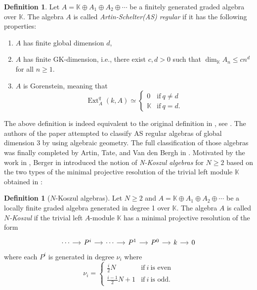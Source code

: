 \documentclass[reqno]{amsart}
\newcommand{\bbK}{\mathbb{K}}
\DeclareMathOperator{\ext}{Ext}
\numberwithin{equation}{section}
\theoremstyle{plain}
\theoremstyle{definition}
\newtheorem{de}[equation]{Definition}
\begin{document}
\begin{de}\cite{RogalskiAS}
    Let $A=\bbK\oplus A_1\oplus A_2\oplus\cdots$ be a finitely generated graded algebra over $\bbK$. The algebra $A$ is called \emph{Artin-Schelter(AS) regular} if it has the following properties:
    \begin{enumerate}
        \item $A$ has finite global dimension $d$, 
        \item $A$ has finite GK-dimension, i.e., there exist $c, d>0$ such that $\dim_\bbK A_n\leq cn^d$ for all $n\geq1$.
        \item $A$ is Gorenstein, meaning that
        $$\ext^q_A(k, A)\simeq\left\{\begin{array}{llll}
        0 & \text{if}\ q\neq d\\
        \bbK & \text{if}\ q=d.
        \end{array}\right.$$
    \end{enumerate}
\end{de}

The above definition is indeed equivalent to the original definition in \cite{ArtinSchelter}, see \cite[Remark 2.13]{RogalskiNPC}.
The authors of the paper \cite{ArtinSchelter} attempted to classify AS regular algebras of global dimension 3 by using algebraic geometry. The full classification of those algebras was finally completed by Artin, Tate, and Van den Bergh in \cite{ArtinTateVandenBerghelliptic}. Motivated by the work in \cite{ArtinSchelter}, Berger in \cite{Berger} introduced the notion of \emph{N-Koszul algebras} for $N\geq 2$ based on the two types of the minimal projective resolution of the trivial left module $\bbK$ obtained in \cite{ArtinSchelter}: 

\begin{de}[$N$-Koszul algebras]\cite[Definition 2.10]{Berger}
    Let $N\geq2$ and $A=\bbK\oplus A_1\oplus A_2\oplus\cdots$ be a locally finite graded algebra generated in degree 1 over $\bbK$. The algebra $A$ is called \emph{$N$-Koszul} if the trivial left $A$-module $\bbK$ has a minimal projective resolution of the form
\[\begin{tikzcd}[column sep=small]
	\cdots & {P^i} & \cdots & {P^1} & {P^0} & k & 0
	\arrow[from=1-1, to=1-2]
	\arrow[from=1-2, to=1-3]
	\arrow[from=1-3, to=1-4]
	\arrow[from=1-4, to=1-5]
	\arrow[from=1-5, to=1-6]
	\arrow[from=1-6, to=1-7]
\end{tikzcd}\]
    where each $P^i$ is generated in degree $\nu_i$ where
    $$\nu_i=\left\{\begin{array}{llll}
        \frac{i}{2}N & \text{if}\ i\ \text{is even}\\
        \frac{i-1}{2}N+1 & \text{if}\ i\ \text{is odd}.
        \end{array}\right.$$
\end{de}
\end{document}
